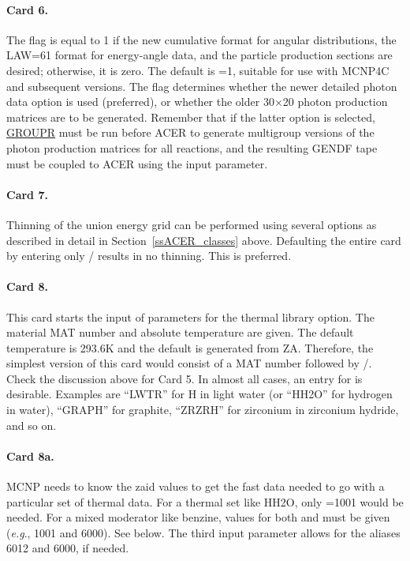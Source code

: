 \paragraph{Card 6.}
The flag  is equal to 1 if the new cumulative
format for angular distributions, the LAW=61 format for energy-angle
data, and the particle production sections are desired; otherwise, it
is zero.  The default is =1, suitable for use with MCNP4C
and subsequent versions.  The flag  determines whether the
newer detailed photon data option is used (preferred), or whether the
older 30$\times$20 photon production matrices are to be generated.
Remember that if the latter option is selected,
\hyperlink{sGROUPRhy}{GROUPR} must be run
before ACER to generate multigroup versions of the photon production
matrices for all reactions, and the resulting GENDF tape must be
coupled to ACER using the  input parameter.

\paragraph{Card 7.}
Thinning of the union energy grid can be performed using several options
as described in detail in Section~\ref{ssACER_classes} above.  Defaulting
the entire card
by entering only / results in no thinning.  This is preferred.

\paragraph{Card 8.}
This card starts the input of parameters for the thermal library option.
The material MAT number and absolute temperature are given. The default
temperature is 293.6K and the default  is generated from ZA.
Therefore, the simplest version of this card would consist of a MAT
number followed by /.  Check the discussion above for Card 5.  In almost
all cases, an entry for  is desirable.  Examples are
``LWTR'' for H in light water (or ``HH2O'' for hydrogen in water),
``GRAPH'' for graphite, ``ZRZRH'' for zirconium in zirconium hydride,
and so on.

\paragraph{Card 8a.}
MCNP needs to know the zaid values to get the fast data needed to go
with a particular set of thermal data.  For a thermal set like HH2O,
only =1001 would be needed.  For a mixed moderator like
benzine, values for both  and  must
be given ({\it e.g}., 1001 and 6000).  See  below.    The
third input parameter allows for the aliases 6012 and 6000, if
needed.

